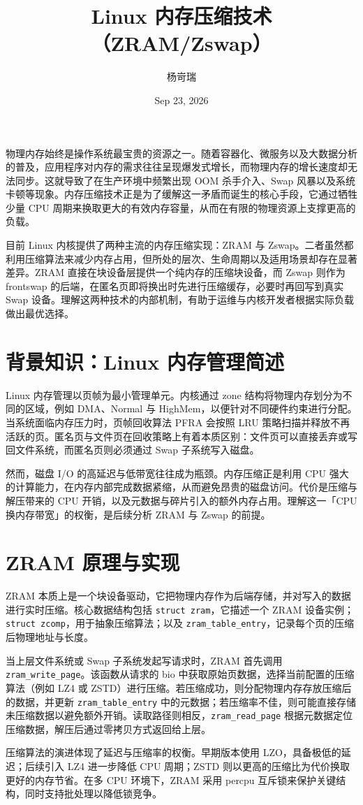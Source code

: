 \title{Linux 内存压缩技术（ZRAM/Zswap）}
\author{杨岢瑞}
\date{Sep 23, 2026}
\maketitle
物理内存始终是操作系统最宝贵的资源之一。随着容器化、微服务以及大数据分析的普及，应用程序对内存的需求往往呈现爆发式增长，而物理内存的增长速度却无法同步。这就导致了在生产环境中频繁出现 OOM 杀手介入、Swap 风暴以及系统卡顿等现象。内存压缩技术正是为了缓解这一矛盾而诞生的核心手段，它通过牺牲少量 CPU 周期来换取更大的有效内存容量，从而在有限的物理资源上支撑更高的负载。\par
目前 Linux 内核提供了两种主流的内存压缩实现：ZRAM 与 Zswap。二者虽然都利用压缩算法来减少内存占用，但所处的层次、生命周期以及适用场景却存在显著差异。ZRAM 直接在块设备层提供一个纯内存的压缩块设备，而 Zswap 则作为 frontswap 的后端，在匿名页即将换出时先进行压缩缓存，必要时再回写到真实 Swap 设备。理解这两种技术的内部机制，有助于运维与内核开发者根据实际负载做出最优选择。\par
\chapter{背景知识：Linux 内存管理简述}
Linux 内存管理以页帧为最小管理单元。内核通过 zone 结构将物理内存划分为不同的区域，例如 DMA、Normal 与 HighMem，以便针对不同硬件约束进行分配。当系统面临内存压力时，页帧回收算法 PFRA 会按照 LRU 策略扫描并释放不再活跃的页。匿名页与文件页在回收策略上有着本质区别：文件页可以直接丢弃或写回文件系统，而匿名页则必须通过 Swap 子系统写入磁盘。\par
然而，磁盘 I/O 的高延迟与低带宽往往成为瓶颈。内存压缩正是利用 CPU 强大的计算能力，在内存内部完成数据紧缩，从而避免昂贵的磁盘访问。代价是压缩与解压带来的 CPU 开销，以及元数据与碎片引入的额外内存占用。理解这一「CPU 换内存带宽」的权衡，是后续分析 ZRAM 与 Zswap 的前提。\par
\chapter{ZRAM 原理与实现}
ZRAM 本质上是一个块设备驱动，它把物理内存作为后端存储，并对写入的数据进行实时压缩。核心数据结构包括 \texttt{struct zram}，它描述一个 ZRAM 设备实例；\texttt{struct zcomp}，用于抽象压缩算法；以及 \texttt{zram\_{}table\_{}entry}，记录每个页的压缩后物理地址与长度。\par
当上层文件系统或 Swap 子系统发起写请求时，ZRAM 首先调用 \texttt{zram\_{}write\_{}page}。该函数从请求的 bio 中获取原始页数据，选择当前配置的压缩算法（例如 LZ4 或 ZSTD）进行压缩。若压缩成功，则分配物理内存存放压缩后的数据，并更新 \texttt{zram\_{}table\_{}entry} 中的元数据；若压缩率不佳，则可能直接存储未压缩数据以避免额外开销。读取路径则相反，\texttt{zram\_{}read\_{}page} 根据元数据定位压缩数据，解压后通过零拷贝方式返回给上层。\par
压缩算法的演进体现了延迟与压缩率的权衡。早期版本使用 LZO，具备极低的延迟；后续引入 LZ4 进一步降低 CPU 周期；ZSTD 则以更高的压缩比为代价换取更好的内存节省。在多 CPU 环境下，ZRAM 采用 percpu 互斥锁来保护关键结构，同时支持批处理以降低锁竞争。\par
